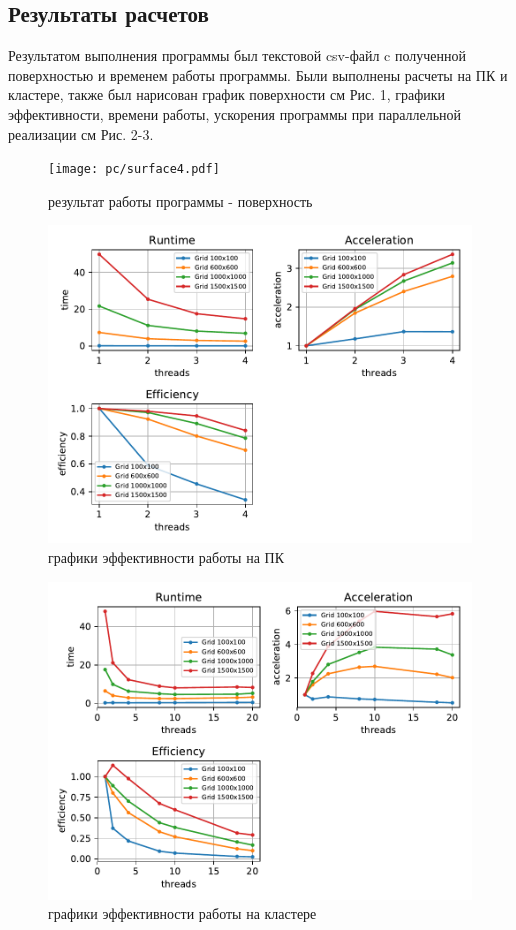 \documentclass[12pt]{article}
\begin{document}
\subsection{Результаты расчетов}
Результатом выполнения программы был текстовой csv-файл c полученной поверхностью и временем работы программы. Были выполнены расчеты на ПК и кластере, также был нарисован график поверхности см Рис. 1, графики эффективности, времени работы, ускорения программы при параллельной реализации см Рис. 2-3.
\\
	\begin{figure}
		\centering
		\texttt{[image: pc/surface4.pdf]}
		\caption{результат работы программы - поверхность}
		
		\includegraphics[scale=0.7]{pc/eff_plots.pdf}
		\caption{графики эффективности работы на ПК}
	\end{figure}
\newpage
	\begin{figure}
		\centering
		\includegraphics[scale=0.7]{cluster/eff_plots.pdf}
		\caption{графики эффективности работы на кластере}
	\end{figure}
	
\end{document}
